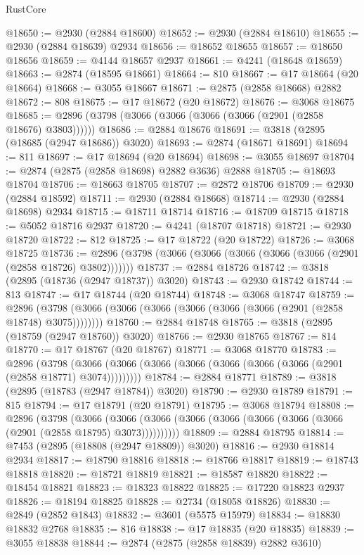 \begin{lexlean}{RustCore}
\begin{coremodule}
@18650 := @2930 (@2884 @18600)
@18652 := @2930 (@2884 @18610)
@18655 := @2930 (@2884 @18639) @2934
@18656 := @18652 @18655
@18657 := @18650 @18656
@18659 := @4144 @18657 @2937
@18661 := @4241 (@18648 @18659)
@18663 := @2874 (@18595 @18661)
@18664 := 810
@18667 := @17 @18664 (@20 @18664)
@18668 := @3055 @18667
@18671 := @2875 (@2858 @18668) @2882
@18672 := 808
@18675 := @17 @18672 (@20 @18672)
@18676 := @3068 @18675
@18685 := @2896 (@3798 (@3066 (@3066 (@3066 (@3066 (@2901 (@2858 @18676) @3803))))))
@18686 := @2884 @18676
@18691 := @3818 (@2895 (@18685 (@2947 @18686)) @3020)
@18693 := @2874 (@18671 @18691)
@18694 := 811
@18697 := @17 @18694 (@20 @18694)
@18698 := @3055 @18697
@18704 := @2874 (@2875 (@2858 @18698) @2882 @3636) @2888
@18705 := @18693 @18704
@18706 := @18663 @18705
@18707 := @2872 @18706
@18709 := @2930 (@2884 @18592)
@18711 := @2930 (@2884 @18668)
@18714 := @2930 (@2884 @18698) @2934
@18715 := @18711 @18714
@18716 := @18709 @18715
@18718 := @5052 @18716 @2937
@18720 := @4241 (@18707 @18718)
@18721 := @2930 @18720
@18722 := 812
@18725 := @17 @18722 (@20 @18722)
@18726 := @3068 @18725
@18736 := @2896 (@3798 (@3066 (@3066 (@3066 (@3066 (@3066 (@2901 (@2858 @18726) @3802)))))))
@18737 := @2884 @18726
@18742 := @3818 (@2895 (@18736 (@2947 @18737)) @3020)
@18743 := @2930 @18742
@18744 := 813
@18747 := @17 @18744 (@20 @18744)
@18748 := @3068 @18747
@18759 := @2896 (@3798 (@3066 (@3066 (@3066 (@3066 (@3066 (@3066 (@2901 (@2858 @18748) @3075))))))))
@18760 := @2884 @18748
@18765 := @3818 (@2895 (@18759 (@2947 @18760)) @3020)
@18766 := @2930 @18765
@18767 := 814
@18770 := @17 @18767 (@20 @18767)
@18771 := @3068 @18770
@18783 := @2896
    (@3798 (@3066 (@3066 (@3066 (@3066 (@3066 (@3066 (@3066 (@2901 (@2858 @18771) @3074)))))))))
@18784 := @2884 @18771
@18789 := @3818 (@2895 (@18783 (@2947 @18784)) @3020)
@18790 := @2930 @18789
@18791 := 815
@18794 := @17 @18791 (@20 @18791)
@18795 := @3068 @18794
@18808 := @2896
    (@3798
      (@3066 (@3066 (@3066 (@3066 (@3066 (@3066 (@3066 (@3066 (@2901 (@2858 @18795) @3073))))))))))
@18809 := @2884 @18795
@18814 := @7453 (@2895 (@18808 (@2947 @18809)) @3020)
@18816 := @2930 @18814 @2934
@18817 := @18790 @18816
@18818 := @18766 @18817
@18819 := @18743 @18818
@18820 := @18721 @18819
@18821 := @18587 @18820
@18822 := @18454 @18821
@18823 := @18323 @18822
@18825 := @17220 @18823 @2937
@18826 := @18194 @18825
@18828 := @2734 (@18058 @18826)
@18830 := @2849 (@2852 @1843)
@18832 := @3601 (@5575 @15979)
@18834 := @18830 @18832 @2768
@18835 := 816
@18838 := @17 @18835 (@20 @18835)
@18839 := @3055 @18838
@18844 := @2874 (@2875 (@2858 @18839) @2882 @3610)

\end{coremodule}
\end{lexlean}
